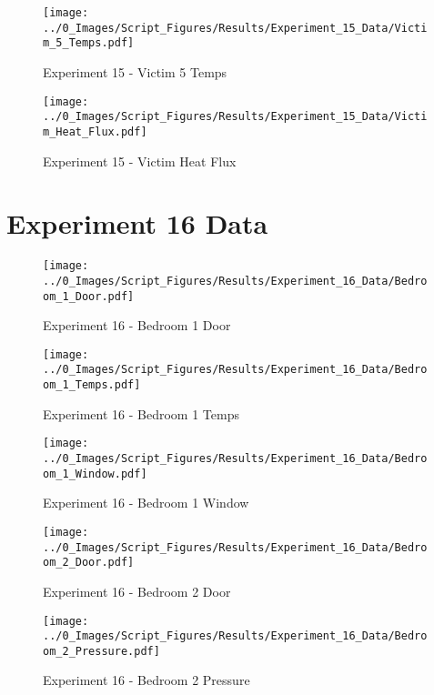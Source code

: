 	\clearpage

	\begin{figure}[H]
		\centering
		\texttt{[image: ../0\_Images/Script\_Figures/Results/Experiment\_15\_Data/Victim\_5\_Temps.pdf]}
		\caption[]{Experiment 15 - Victim 5 Temps}
	\end{figure}
 

	\begin{figure}[H]
		\centering
		\texttt{[image: ../0\_Images/Script\_Figures/Results/Experiment\_15\_Data/Victim\_Heat\_Flux.pdf]}
		\caption[]{Experiment 15 - Victim Heat Flux}
	\end{figure}
 
	\clearpage

\clearpage		\large
\section{Experiment 16 Data} \label{App:Exp16Results} 

	\begin{figure}[H]
		\centering
		\texttt{[image: ../0\_Images/Script\_Figures/Results/Experiment\_16\_Data/Bedroom\_1\_Door.pdf]}
		\caption[]{Experiment 16 - Bedroom 1 Door}
	\end{figure}
 

	\begin{figure}[H]
		\centering
		\texttt{[image: ../0\_Images/Script\_Figures/Results/Experiment\_16\_Data/Bedroom\_1\_Temps.pdf]}
		\caption[]{Experiment 16 - Bedroom 1 Temps}
	\end{figure}
 
	\clearpage

	\begin{figure}[H]
		\centering
		\texttt{[image: ../0\_Images/Script\_Figures/Results/Experiment\_16\_Data/Bedroom\_1\_Window.pdf]}
		\caption[]{Experiment 16 - Bedroom 1 Window}
	\end{figure}
 

	\begin{figure}[H]
		\centering
		\texttt{[image: ../0\_Images/Script\_Figures/Results/Experiment\_16\_Data/Bedroom\_2\_Door.pdf]}
		\caption[]{Experiment 16 - Bedroom 2 Door}
	\end{figure}
 
	\clearpage

	\begin{figure}[H]
		\centering
		\texttt{[image: ../0\_Images/Script\_Figures/Results/Experiment\_16\_Data/Bedroom\_2\_Pressure.pdf]}
		\caption[]{Experiment 16 - Bedroom 2 Pressure}
	\end{figure}
 

